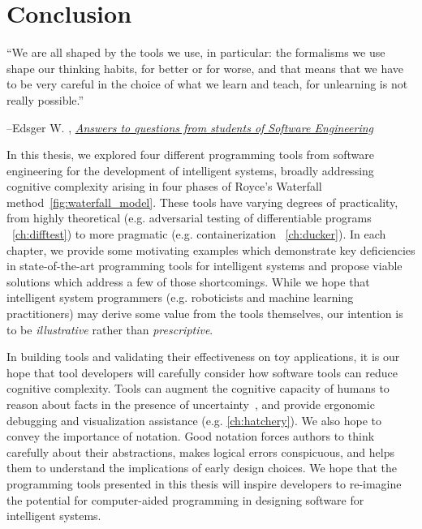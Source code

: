 \chapter{Conclusion}\label{ch:conclusion}
\setlength{\epigraphwidth}{0.90\textwidth}
\epigraph{``We are all shaped by the tools we use, in particular: the formalisms we use shape our thinking habits, for better or for worse, and that means that we have to be very careful in the choice of what we learn and teach, for unlearning is not really possible.''}{\begin{flushright}--Edsger W. \citet{dijkstra2000answers}, \href{https://www.cs.utexas.edu/~EWD/transcriptions/EWD13xx/EWD1305.html}{\textit{Answers to questions from students of Software Engineering}}\end{flushright}}

In this thesis, we explored four different programming tools from software engineering for the development of intelligent systems, broadly addressing cognitive complexity arising in four phases of Royce's Waterfall method~\autoref{fig:waterfall_model}. These tools have varying degrees of practicality, from highly theoretical (e.g. adversarial testing of differentiable programs ~\autoref{ch:difftest}) to more pragmatic (e.g. containerization ~\autoref{ch:ducker}). In each chapter, we provide some motivating examples which demonstrate key deficiencies in state-of-the-art programming tools for intelligent systems and propose viable solutions which address a few of those shortcomings. While we hope that intelligent system programmers (e.g. roboticists and machine learning practitioners) may derive some value from the tools themselves, our intention is to be \textit{illustrative} rather than \textit{prescriptive}.

In building tools and validating their effectiveness on toy applications, it is our hope that tool developers will carefully consider how software tools can reduce cognitive complexity. Tools can augment the cognitive capacity of humans to reason about facts in the presence of uncertainty~\citep{famelis2012partial}, and provide ergonomic debugging and visualization assistance (e.g. \autoref{ch:hatchery}). We also hope to convey the importance of notation. Good notation forces authors to think carefully about their abstractions, makes logical errors conspicuous, and helps them to understand the implications of early design choices. We hope that the programming tools presented in this thesis will inspire developers to re-imagine the potential for computer-aided programming in designing software for intelligent systems.

